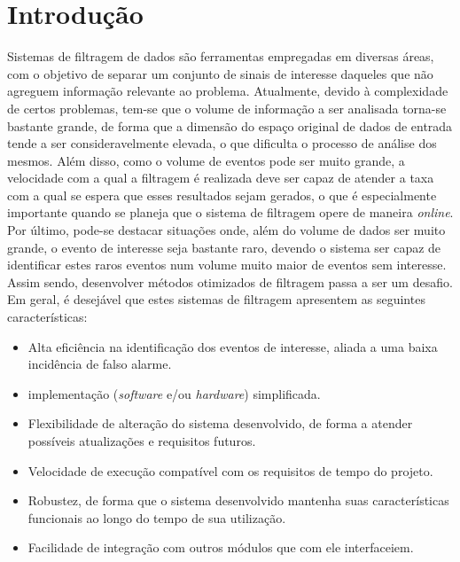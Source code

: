 \chapter{Introdução}
\label{chap:introducao}

Sistemas de filtragem de dados são ferramentas empregadas em diversas áreas, com o objetivo de separar um conjunto de sinais de interesse daqueles que não agreguem informação relevante ao problema. Atualmente, devido à complexidade de certos problemas, tem-se que o volume de informação a ser analisada torna-se bastante grande, de forma que a dimensão do espaço original de dados de entrada tende a ser consideravelmente elevada, o que dificulta o processo de análise dos mesmos. Além disso, como o volume de eventos pode ser muito grande, a velocidade com a qual a filtragem é realizada deve ser capaz de atender a taxa com a qual se espera que esses resultados sejam gerados, o que é especialmente importante quando se planeja que o sistema de filtragem opere de maneira \emph{online}. Por último, pode-se destacar situações onde, além do volume de dados ser muito grande, o evento de interesse seja bastante raro, devendo o sistema ser capaz de identificar estes raros eventos num volume muito maior de eventos sem interesse. Assim sendo, desenvolver métodos otimizados de filtragem passa a ser um desafio. Em geral, é desejável que estes sistemas de filtragem apresentem as seguintes características:

\begin{itemize}

\item Alta eficiência na identificação dos eventos de interesse, aliada a uma baixa incidência de falso alarme.

\item implementação (\emph{software} e/ou \emph{hardware}) simplificada.

\item Flexibilidade de alteração do sistema desenvolvido, de forma a atender possíveis atualizações e requisitos futuros.

\item Velocidade de execução compatível com os requisitos de tempo do projeto.

\item Robustez, de forma que o sistema desenvolvido mantenha suas características funcionais ao longo do tempo de sua utilização.

\item Facilidade de integração com outros módulos que com ele interfaceiem.

\end{itemize}


